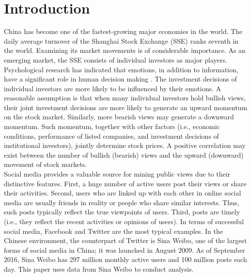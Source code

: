 \documentclass[review,3p,times,12pt,number]{elsarticle}
\begin{document}
\section{Introduction}
China has become one of the fastest-growing major economies in the world. The daily average turnover of the Shanghai Stock Exchange (SSE) ranks seventh in the world. Examining its market movements is of considerable importance. As an emerging market, the SSE consists of individual investors as major players. Psychological research has indicated that emotions, in addition to information, have a significant role in human decision making \cite{Dolan2002}. The investment decisions of individual investors are more likely to be influenced by their emotions. A reasonable assumption is that when many individual investors hold bullish views, their joint investment decisions are more likely to generate an upward momentum on the stock market. Similarly, more bearish views may generate a downward momentum. Such momentum, together with other factors (i.e., economic conditions, performance of listed companies, and investment decisions of institutional investors), jointly determine stock prices. A positive correlation may exist between the number of bullish (bearish) views and the upward (downward) movement of stock markets.\\
\indent
Social media provides a valuable source for mining public views due to their distinctive features. First, a huge number of active users post their views or share their activities. Second, users who are linked up with each other in online social media are usually friends in reality or people who share similar interests. Thus, such posts typically reflect the true viewpoints of users. Third, posts are timely (i.e., they reflect the recent activities or opinions of users). In terms of successful social media, Facebook and Twitter are the most typical examples. In the Chinese environment, the counterpart of Twitter is Sina Weibo, one of the largest forms of social media in China; it was launched in August 2009. As of September 2016, Sina Weibo has 297 million monthly active users and 100 million posts each day. This paper uses data from Sina Weibo to conduct analysis.\\
\indent
\end{document}
